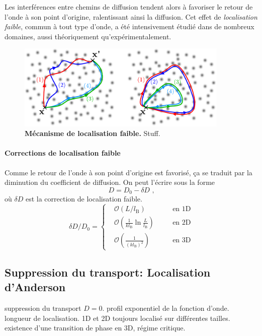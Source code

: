 Les interférences entre chemins de diffusion tendent alors à favoriser le retour de l'onde à son point d'origine, ralentissant ainsi la diffusion. Cet effet de \emph{localisation faible}, commun à tout type d'onde, a été intensivement étudié dans de nombreux domaines, aussi théoriquement qu'expérimentalement.


\begin{figure}
\centering
\includegraphics[width=0.9\textwidth]{Fig/Localisation/localisation_faible.pdf}
\caption{\textbf{Mécanisme de localisation faible.} Stuff.}
\label{fig:localisation_faible}
\end{figure}

\paragraph*{Corrections de localisation faible}
Comme le retour de l'onde à son point d'origine est favorisé, ça se traduit par la diminution du coefficient de diffusion. On peut l'écrire sous la forme
\begin{equation}
D= D_{\mathrm{0}}-\delta D \text{ ,}
\end{equation}
où $\delta D$ est la correction de localisation faible.
\begin{equation}
\delta D/ D_{\mathrm{0}} = \left\lbrace \begin{aligned}
& \mathcal{O}\left(L/l_{\mathrm{B}}\right)  \quad &&\text{en 1D}\\
& \mathcal{O}\left(\frac{1}{k l_{\mathrm{B}}} \ln{\frac{L}{l_{\mathrm{B}}}} \right) \quad &&\text{en 2D}\\
& \mathcal{O}\left(\frac{1}{(k l_{\mathrm{B}})^2}\right) \quad &&\text{en 3D}
\end{aligned}\right.
\end{equation}









\subsection{Suppression du transport: Localisation d'Anderson}
\label{sc:localisation_anderson}
suppression du transport $D=0$. profil exponentiel de la fonction d'onde. longueur de localisation.
1D et 2D toujours localisé sur différentes tailles. existence d'une transition de phase en 3D, régime critique.

